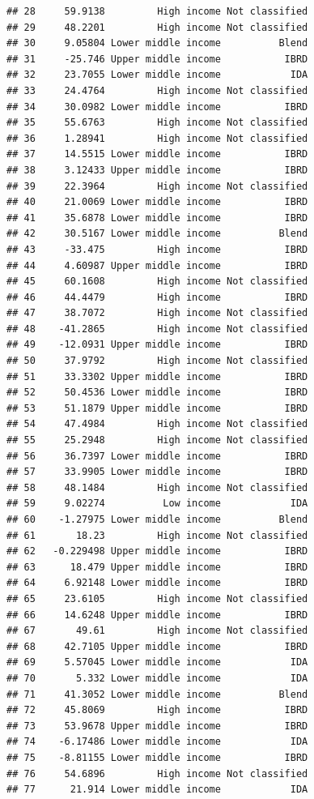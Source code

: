\documentclass[
]{article}
\begin{document}
\begin{verbatim}
## 28     59.9138         High income Not classified
## 29     48.2201         High income Not classified
## 30     9.05804 Lower middle income          Blend
## 31     -25.746 Upper middle income           IBRD
## 32     23.7055 Lower middle income            IDA
## 33     24.4764         High income Not classified
## 34     30.0982 Lower middle income           IBRD
## 35     55.6763         High income Not classified
## 36     1.28941         High income Not classified
## 37     14.5515 Lower middle income           IBRD
## 38     3.12433 Upper middle income           IBRD
## 39     22.3964         High income Not classified
## 40     21.0069 Lower middle income           IBRD
## 41     35.6878 Lower middle income           IBRD
## 42     30.5167 Lower middle income          Blend
## 43     -33.475         High income           IBRD
## 44     4.60987 Upper middle income           IBRD
## 45     60.1608         High income Not classified
## 46     44.4479         High income           IBRD
## 47     38.7072         High income Not classified
## 48    -41.2865         High income Not classified
## 49    -12.0931 Upper middle income           IBRD
## 50     37.9792         High income Not classified
## 51     33.3302 Upper middle income           IBRD
## 52     50.4536 Lower middle income           IBRD
## 53     51.1879 Upper middle income           IBRD
## 54     47.4984         High income Not classified
## 55     25.2948         High income Not classified
## 56     36.7397 Lower middle income           IBRD
## 57     33.9905 Lower middle income           IBRD
## 58     48.1484         High income Not classified
## 59     9.02274          Low income            IDA
## 60    -1.27975 Lower middle income          Blend
## 61       18.23         High income Not classified
## 62   -0.229498 Upper middle income           IBRD
## 63      18.479 Upper middle income           IBRD
## 64     6.92148 Lower middle income           IBRD
## 65     23.6105         High income Not classified
## 66     14.6248 Upper middle income           IBRD
## 67       49.61         High income Not classified
## 68     42.7105 Upper middle income           IBRD
## 69     5.57045 Lower middle income            IDA
## 70       5.332 Lower middle income            IDA
## 71     41.3052 Lower middle income          Blend
## 72     45.8069         High income           IBRD
## 73     53.9678 Upper middle income           IBRD
## 74    -6.17486 Lower middle income            IDA
## 75    -8.81155 Lower middle income           IBRD
## 76     54.6896         High income Not classified
## 77      21.914 Lower middle income            IDA

\end{verbatim}
\end{document}
